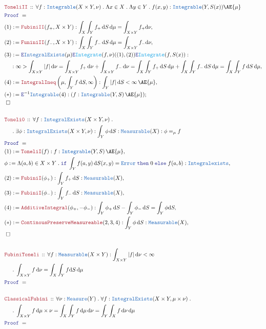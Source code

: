 \documentclass[12pt]{scrartcl}
\newcommand{\TYPE}[1]{\textcolor{NavyBlue}{\mathtt{#1}}}
\newcommand{\FUNC}[1]{\textcolor{Cerulean}{\mathtt{#1}}}
\newcommand{\LOGIC}[1]{\textcolor{Blue}{\mathtt{#1}}}
\newcommand{\THM}[1]{\textcolor{Maroon}{\mathtt{#1}}}
\renewcommand{\.}{\; . \;}
\newcommand{\de}{: \kern 0.1pc =}
\newcommand{\If}{\LOGIC{if} \;}
\newcommand{\Then}{ \; \LOGIC{then} \;}
\newcommand{\Else}{\; \LOGIC{else} \;}
\newcommand{\Theorem}[2]{& \THM{#1} \, :: \, #2 \\ & \Proof = \\ }
\newcommand{\NewLine}{\\ & \kern 1pc}
\newcommand{\Page}[1]{ \begin{align*} #1 \end{align*}   }
\newcommand{\ForEach}[3]{\forall #1 : #2 \. #3 }
\newcommand{\Say}[3]{& #1 \de #2 : #3, \\}
\newcommand{\Conclude}[3]{& #1 \de #2 : #3; \\}
\newcommand{\ByDef}{\LOGIC{E}}
\newcommand{\QED}{\; \square}
\newcommand{\EndProof}{& \QED \\}
\newcommand{\Proof}{\LOGIC{Proof} \; }
\begin{document}
\newpage
\Page{
\Theorem{ToneliII}{
\ForEach{f}{\TYPE{Integrable}(X \times Y, \nu)}{
 \Lambda x \in X \.  \Lambda y \in Y \. f(x,y) : \TYPE{Integrable}(Y,S(x)) \AE{\mu}
}}
\Say{(1)}{ \THM{FubiniII}(f_+,X \times Y) }
{ \int_X \int_Y f_+ \, \mathrm{d} S \, \mathrm{d}\mu 
 = \int_{X \times Y} f_+ \mathrm{d}{\nu}  
 }
\Say{(2)}{ \THM{FuniniII}(f_-,X \times Y)}
{
 \int_X \int_Y f_- \, \mathrm{d} S \, \mathrm{d} \mu
 = \int_{X \times Y} f_- \mathrm{d}{\nu}
}
\Say{(3)}{ \ByDef\TYPE{IntegralExists}(\mu)\ByDef\FUNC{Integrate}(f,\nu)((1),(2))\ByDef\FUNC{Integrate}(f,S(x))  : \NewLine }
{ \infty >  \int_{X \times Y} |f|  \,\mathrm{d} \nu  
 = \int_{X \times Y} f_+ \, \mathrm{d} \nu
  + \int_{X \times Y} f_- \, \mathrm{d} \nu =
 \int_X \int_Y f_+ \, \mathrm{d} S \, \mathrm{d} \mu
 + \int_X \int_Y f_- \, \mathrm{d} S \, \mathrm{d} \mu =
\int_X \int_Y f \, \mathrm{d} S \, \mathrm{d} \mu
}
\Say{(4)}{\THM{IntegralIneq}\left( \mu  , \int_Y f \, \mathrm{d} S, \infty \right)}
{ \int_Y |f| \,  \mathrm{d}  S  < \infty  \, \AE{\mu} }
\Conclude{(*)}{\ByDef^{-1} \TYPE{Integrable}(4)}{ ( f : \TYPE{Integrable}(Y,S) \, \AE{\mu} ) }
\EndProof
\\
\Theorem{Toneli0}{
\ForEach{f}{\TYPE{IntegralExists}(X \times Y, \nu)  \. \NewLine }
{ \exists \phi : \TYPE{IntegralExists}(X \times Y, \nu) :  \int_Y \phi  \, \mathrm{d}S : \TYPE{Measurable}(X) : \phi =_\mu  f
}}
\Say{(1)}{ \THM{ToneliI}(f)}{ f : \TYPE{Integrable}(Y,S) \, \AE{\mu} }
\Say{\phi}{ \Lambda (a,b) \in X \times Y \. \If \int_Y f(a,y) \, \mathrm{d}S(x,y) = \TYPE{Error} \Then 0 \Else f(a,b)  }
{ \TYPE{Integralexists}}
\Say{(2)}{\THM{FubiniI}(\phi_+)}{ \int_Y f_+ \, \mathrm{d}S : \TYPE{Measurable}(X) }
\Say{(3)}{ \THM{FubiniI}(\phi_-)}{ \int_Y f_- \, \mathrm{d}S : \TYPE{Measurable}(X)}
\Say{(4)}{ \THM{AdditiveIntegral}(\phi_+, -\phi_-) }{ \int_Y \phi_+ \, \mathrm{d}S - \int_Y \phi_- \, \mathrm{d}S =   \int_Y \phi \mathrm{d}S }
\Say{(*)}{\THM{ContinousPreserveMeasureable}(2,3,4)}{ \int_Y \phi \, \mathrm{d}S : \TYPE{Measurable}(X)}
\EndProof
\\
\Theorem{FubiniToneli}{
\ForEach{f}{\TYPE{Measurable}(X \times Y)  : \int_{X \times Y} |f| \, \mathrm{d}\nu < \infty \NewLine }
{ \int_{X \times Y} f \, \mathrm{d} \nu = \int_X \int_Y f \mathrm{d}S \,  \mathrm{d}\mu  }}
\\
\Theorem{ClassicalFubini}{
 \ForEach{\nu}{\TYPE{Measure}(Y)}{
 \ForEach{ f }{\TYPE{IntegralExists}(X \times Y, \mu \times \nu) \. \NewLine}{
  \int_{X \times Y} f \, \mathrm{d}\mu \times \nu =
   \int_X \int_Y f \, \mathrm{d}\mu \, \mathrm{d} \nu =
   \int_Y \int_X f \, \mathrm{d}\nu  \,\mathrm{d} \mu
}}} 
}
\newpage
\end{document}
